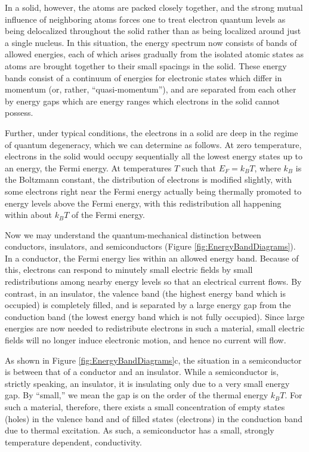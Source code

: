 \documentclass{../lab}
\begin{document}
In a solid, however, the atoms are packed closely together, and the strong mutual influence of neighboring atoms forces one to treat electron quantum levels as being delocalized throughout the solid rather than as being localized around just a single nucleus. In this situation, the energy spectrum now consists of bands of allowed energies, each of which arises gradually from the isolated atomic states as atoms are brought together to their small spacings in the solid. These energy bands consist of a continuum of energies for electronic states which differ in momentum (or, rather, ``quasi-momentum''), and are separated from each other by energy gaps which are energy ranges which electrons in the solid cannot possess.

Further, under typical conditions, the electrons in a solid are deep in the regime of quantum degeneracy, which we can determine as follows. At zero temperature, electrons in the solid would occupy sequentially all the lowest energy states up to an energy, the Fermi energy. At temperatures $T$ such that $E_F = k_B T$, where $k_B$ is the Boltzmann constant, the distribution of electrons is modified slightly, with some electrons right near the Fermi energy actually being thermally promoted to energy levels above the Fermi energy, with this redistribution all happening within about $k_B T$ of the Fermi energy.

Now we may understand the quantum-mechanical distinction between conductors, insulators, and semiconductors (Figure \ref{fig:EnergyBandDiagrams}). In a conductor, the Fermi energy lies within an allowed energy band. Because of this, electrons can respond to minutely small electric fields by small redistributions among nearby energy levels so that an electrical current flows. By contrast, in an insulator, the valence band (the highest energy band which is occupied) is completely filled, and is separated by a large energy gap from the conduction band (the lowest energy band which is not fully occupied). Since large energies are now needed to redistribute electrons in such a material, small electric fields will no longer induce electronic motion, and hence no current will flow.

As shown in Figure \ref{fig:EnergyBandDiagrams}c, the situation in a semiconductor is between that of a conductor and an insulator. While a semiconductor is, strictly speaking, an insulator, it is insulating only due to a very small energy gap. By ``small,'' we mean the gap is on the order of the thermal energy $k_B T$. For such a material, therefore, there exists a small concentration of empty states (holes) in the valence band and of filled states (electrons) in the conduction band due to thermal excitation. As such, a semiconductor has a small, strongly temperature dependent, conductivity.
\end{document}
